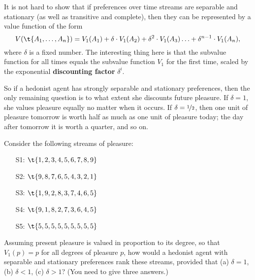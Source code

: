 It is not hard to show that if preferences over time streams are
separable and stationary (as well as transitive and complete), then
they can be represented by a value function of the form
\[
V(\t{A_1,\ldots,A_n}) = V_1(A_1) + \delta \cdot V_1(A_2) +
\delta^2 \cdot V_1(A_3) \ldots + \delta^{n-1} \cdot V_1(A_n),
\]
where $\delta$ is a fixed number. The interesting thing here is that the
subvalue function for all times equals the subvalue function $V_1$ for the first
time, scaled by the exponential \textbf{discounting factor} $\delta^i$.


So if a hedonist agent has strongly separable and stationary preferences, then
the only remaining question is to what extent she discounts future pleasure. If
$\delta = 1$, she values pleasure equally no matter when it occurs. If
$\delta = \nicefrac{1}{2}$, then one unit of pleasure tomorrow is worth half as
much as one unit of pleasure today; the day after tomorrow it is worth a
quarter, and so on.

\begin{exercise1}
  Consider the following streams of pleasure:
  \begin{enumerate}
    \itemsep-0.3em 
  \item[S1:] $\t{1,2,3,4,5,6,7,8,9}$ 
  \item[S2:] $\t{9,8,7,6,5,4,3,2,1}$
  \item[S3:] $\t{1,9,2,8,3,7,4,6,5}$ 
  \item[S4:] $\t{9,1,8,2,7,3,6,4,5}$ 
  \item[S5:] $\t{5,5,5,5,5,5,5,5,5}$
  \end{enumerate}
  Assuming present pleasure is valued in proportion to its degree, so
  that $V_1(p) = p$ for all degrees of pleasure $p$, how would a
  hedonist agent with separable and stationary preferences rank these
  streams, provided that (a) $\delta = 1$, (b)
  $\delta < 1$, (c) $\delta > 1$? (You need to give three answers.)
\end{exercise1}

